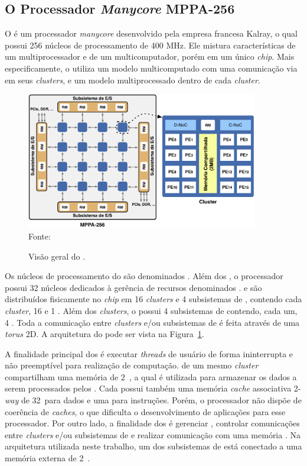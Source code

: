 \subsection{O Processador \textit{Manycore} MPPA-256}
\label{sec:mppa}

O \mppa é um processador \textit{manycore} desenvolvido pela empresa francesa
Kalray, o qual possui 256 núcleos de processamento de 400 MHz. Ele mistura características
de um multiprocessador e de um multicomputador, porém em um único \textit{chip}.
Mais especificamente, o \mppa utiliza um modelo multicomputado com uma
comunicação via \noc em seus \textit{clusters}, e um modelo multiprocessado
dentro de cada \textit{cluster}.

\begin{figure}[t]
	\centering
	\caption{Visão geral do \mppa.}
	\includegraphics[width=0.9\textwidth]{figs/mppa-overall.pdf} \\
    Fonte:~\cite{Castro-IA3:2013}
	\label{fig:mppa}
\end{figure}

Os núcleos de processamento do \mppa são denominados \pes.
Além dos \pes, o processador possui 32 núcleos dedicados à gerência de recursos
denominados  \rmans. \pes e \rmans são distribuídos
fisicamente no \textit{chip} em 16 \textit{clusters} e 4 subsistemas de \es,
contendo cada \textit{cluster}, 16 \pes e 1 \rman. Além dos \textit{clusters}, o
\mppa possui 4 subsistemas de \es contendo, cada um, 4 \rmans. Toda a comunicação
entre \textit{clusters} e/ou subsistemas de \es é feita através de uma \noc
\textit{torus} 2D. A arquitetura do \mppa pode ser vista na Figura~\ref{fig:mppa}.

A finalidade principal dos \pes é executar \textit{threads} de usuário de forma
ininterrupta e não preemptível para realização de computação. \pes de um mesmo
\textit{cluster} compartilham uma memória de 2~\mb, a qual é utilizada para
armazenar os dados a serem processados pelos \pes. Cada \pe possui também uma
memória \textit{cache} associativa 2-\textit{way} de 32~\kb para dados e uma para
instruções. Porém, o processador não dispõe de coerência de \textit{caches}, o
que dificulta o desenvolvimento de aplicações para esse processador. Por outro
lado, a finalidade dos \rmans é gerenciar \es, controlar comunicações entre
\textit{clusters} e/ou subsistemas de \es e realizar comunicação com uma memória
\ram. Na arquitetura utilizada neste trabalho, um dos subsistemas de \es está conectado a uma
memória externa \lpddr de 2~\gb.

